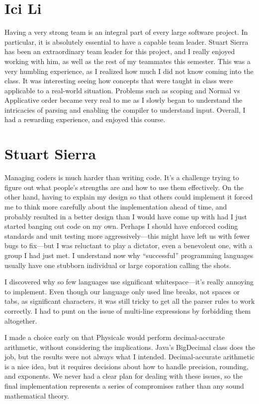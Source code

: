 \section{Ici Li}

Having a very strong team is an integral part of every large software
project. In particular, it is absolutely essential to have a capable
team leader. Stuart Sierra has been an extraordinary team leader for
this project, and I really enjoyed working with him, as well as the
rest of my teammates this semester. This was a very humbling
experience, as I realized how much I did not know coming into the
class. It was interesting seeing how concepts that were taught in
class were applicable to a real-world situation. Problems such as
scoping and Normal vs Applicative order became very real to me as I
slowly began to understand the intricacies of parsing and enabling the
compiler to understand input. Overall, I had a rewarding experience,
and enjoyed this course.



\section{Stuart Sierra}

Managing coders is much harder than writing code.  It's a challenge
trying to figure out what people's strengths are and how to use them
effectively.  On the other hand, having to explain my design so that
others could implement it forced me to think more carefully about the
implementation ahead of time, and probably resulted in a better design
than I would have come up with had I just started banging out code on
my own.  Perhaps I should have enforced coding standards and unit
testing more aggressively---this might have left us with fewer bugs to
fix---but I was reluctant to play a dictator, even a benevolent one,
with a group I had just met.  I understand now why ``successful''
programming languages usually have one stubborn individual or large
coporation calling the shots.

I discovered why so few languages use significant whitespace---it's
really annoying to implement.  Even though our language only used line
breaks, not spaces or tabs, as significant characters, it was still
tricky to get all the parser rules to work correctly.  I had to punt
on the issue of multi-line expressions by forbidding them altogether.

I made a choice early on that Physicalc would perform decimal-accurate
arithmetic, without considering the implications.  Java's BigDecimal
class does the job, but the results were not always what I intended.
Decimal-accurate arithmetic is a nice idea, but it requires decisions
about how to handle precision, rounding, and exponents.  We never had
a clear plan for dealing with these issues, so the final
implementation represents a series of compromises rather than any
sound mathematical theory.
